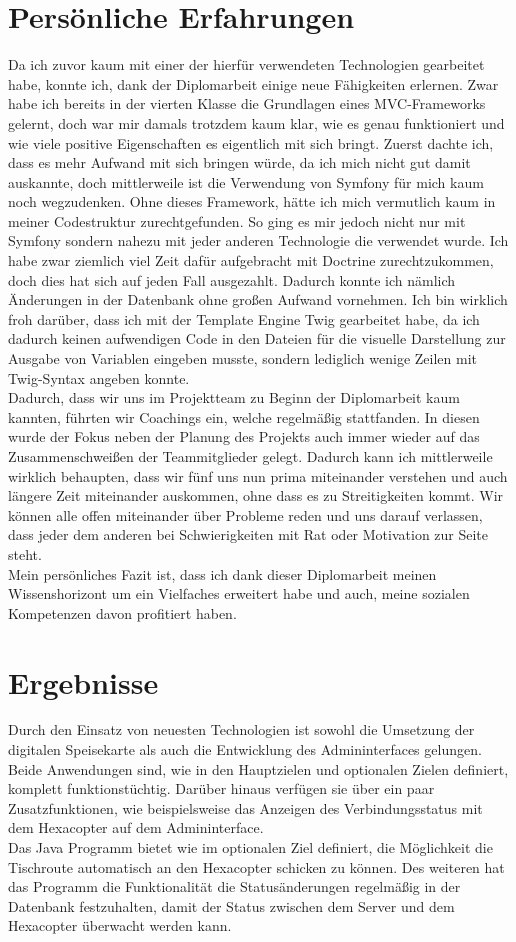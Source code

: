 \section{Persönliche Erfahrungen}
Da ich zuvor kaum mit einer der hierfür verwendeten Technologien gearbeitet habe, konnte ich, dank der Diplomarbeit einige neue Fähigkeiten erlernen.
Zwar habe ich bereits in der vierten Klasse die Grundlagen eines MVC-Frameworks gelernt, doch war mir damals trotzdem kaum klar, wie es genau funktioniert und wie viele positive Eigenschaften es eigentlich mit sich bringt.
Zuerst dachte ich, dass es mehr Aufwand mit sich bringen würde, da ich mich nicht gut damit auskannte, doch mittlerweile ist die Verwendung von Symfony für mich kaum noch wegzudenken. Ohne dieses Framework, hätte ich mich vermutlich kaum in meiner Codestruktur zurechtgefunden.
So ging es mir jedoch nicht nur mit Symfony sondern nahezu mit jeder anderen Technologie die verwendet wurde. 
Ich habe zwar ziemlich viel Zeit dafür aufgebracht mit Doctrine zurechtzukommen, doch dies hat sich auf jeden Fall ausgezahlt. Dadurch konnte ich nämlich Änderungen in der Datenbank ohne großen Aufwand vornehmen. 
Ich bin wirklich froh darüber, dass ich mit der Template Engine Twig gearbeitet habe, da ich dadurch keinen aufwendigen Code in den Dateien für die visuelle Darstellung zur Ausgabe von Variablen eingeben musste, sondern lediglich wenige Zeilen mit Twig-Syntax angeben konnte.
\\
Dadurch, dass wir uns im Projektteam zu Beginn der Diplomarbeit kaum kannten, führten wir Coachings ein, welche regelmäßig stattfanden. In diesen wurde der Fokus neben der Planung des Projekts auch immer wieder auf das Zusammenschweißen der Teammitglieder gelegt. Dadurch kann ich mittlerweile wirklich behaupten, dass wir fünf uns nun prima miteinander verstehen und auch längere Zeit miteinander auskommen, ohne dass es zu Streitigkeiten kommt. Wir können alle offen miteinander über Probleme reden und uns darauf verlassen, dass jeder dem anderen bei Schwierigkeiten mit Rat oder Motivation zur Seite steht.
\\
Mein persönliches Fazit ist, dass ich dank dieser Diplomarbeit meinen Wissenshorizont um ein Vielfaches erweitert habe und auch, meine sozialen Kompetenzen davon profitiert haben. 

\section{Ergebnisse}
Durch den Einsatz von neuesten Technologien ist sowohl die Umsetzung der digitalen Speisekarte als auch die Entwicklung des Admininterfaces gelungen. Beide Anwendungen sind, wie in den Hauptzielen und optionalen Zielen definiert, komplett funktionstüchtig. Darüber hinaus verfügen sie über ein paar Zusatzfunktionen, wie beispielsweise das Anzeigen des Verbindungsstatus mit dem Hexacopter auf dem Admininterface.\\ 
Das Java Programm bietet wie im optionalen Ziel definiert, die Möglichkeit die Tischroute automatisch an den Hexacopter schicken zu können. Des weiteren hat das Programm die Funktionalität die Statusänderungen regelmäßig in der Datenbank festzuhalten, damit der Status zwischen dem Server und dem Hexacopter überwacht werden kann.
